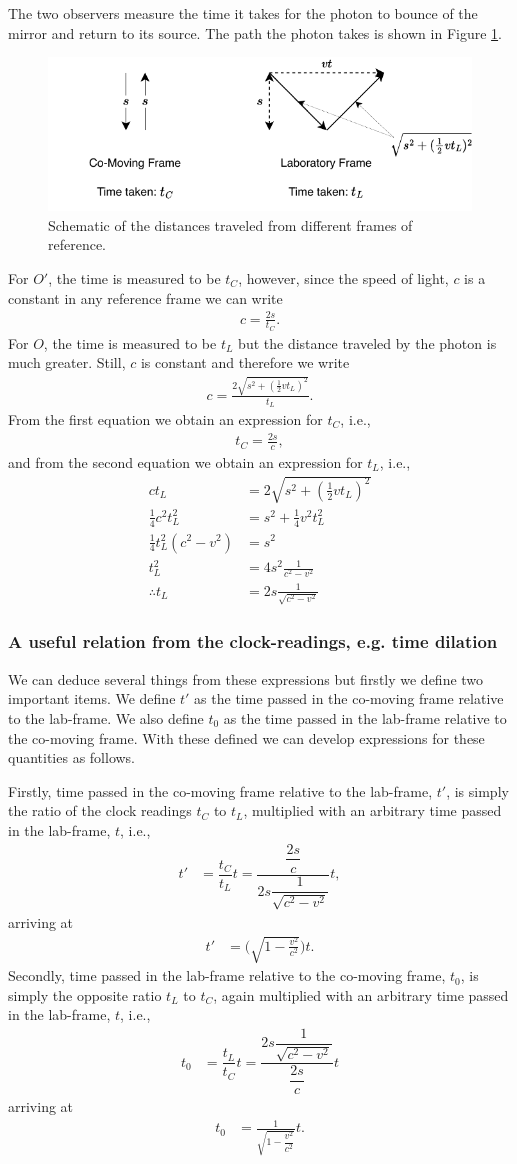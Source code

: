 \documentclass[10pt,letterpaper,notitlepage]{article}
\numberwithin{equation}{section}
\newcommand{\beqn}{\begin{equation}\begin{aligned}}
\newcommand{\eeqn}{\end{aligned}\end{equation}}
\begin{document}
The two observers measure the time it takes for the photon to bounce of the mirror and return to its source. The path the photon takes is shown in Figure \ref{fig:relativitydiag1b}.
\begin{figure}[H]
	\centering
	\includegraphics[width=0.7\linewidth]{figures/RelativityDiag1b.drawio.pdf}
	\caption{Schematic of the distances traveled from different frames of reference.}
	\label{fig:relativitydiag1b}
\end{figure}
For $O'$, the time is measured to be $t_C$, however, since the speed of light, $c$ is a constant in any reference frame we can write
\beqn 
c = \frac{2s}{t_C}.
\eeqn 
For $O$, the time is measured to be $t_L$ but the distance traveled by the photon is much greater. Still, $c$ is constant and therefore we write
\beqn 
c = \frac{2\sqrt{s^2 + (\frac{1}{2}vt_L)^2}}{t_L}.
\eeqn 
From the first equation we obtain an expression for $t_C$, i.e.,
\beqn
t_C = \frac{2s}{c},
\eeqn 
and from the second equation we obtain an expression for $t_L$, i.e.,
\beqn 
ct_L &= 2\sqrt{s^2 + (\frac{1}{2}vt_L)^2} \\
\frac{1}{4} c^2 t_L^2 &= s^2 + \frac{1}{4}v^2 t_L^2 \\
\frac{1}{4} t_L^2 (c^2-v^2) &= s^2 \\
t_L^2 &= 4s^2 \frac{1}{c^2 - v^2} \\
\therefore
t_L &= 2s \frac{1}{\sqrt{c^2-v^2}}
\eeqn 

\subsubsection{A useful relation from the clock-readings, e.g. time dilation}
We can deduce several things from these expressions but firstly we define two important items. We define $t'$ as the time passed in the co-moving frame relative to the lab-frame. We also define $t_0$ as the time passed in the lab-frame relative to the co-moving frame. With these defined we can develop expressions for these quantities as follows.

Firstly, time passed in the co-moving frame relative to the lab-frame, $t'$, is simply the ratio of the clock readings $t_C$ to $t_L$, multiplied with an arbitrary time passed in the lab-frame, $t$, i.e.,
\beqn 
t' &= \dfrac{t_C}{t_L} t
= \dfrac{\dfrac{2s}{c}}
{2s\dfrac{1}{\sqrt{c^2-v^2}}} t,
\eeqn 
arriving at
\beqn \label{eq:time_relativity_t_prime}
t' &= \biggr( \sqrt{1-\frac{v^2}{c^2}} \biggr) t.
\eeqn 
Secondly, time passed in the lab-frame relative to the co-moving frame, $t_0$, is simply the opposite ratio $t_L$ to $t_C$, again multiplied with an arbitrary time passed in the lab-frame, $t$, i.e.,
\beqn 
t_0 &= \dfrac{t_L}{t_C} t 
= \dfrac{2s\dfrac{1}{\sqrt{c^2-v^2}}}
{\dfrac{2s}{c}} t
\eeqn 
arriving at
\beqn \label{eq:time_relativity_t0}
t_0 &= \frac{1}{\sqrt{1-\dfrac{v^2}{c^2}}}t.
\eeqn 
\end{document}
